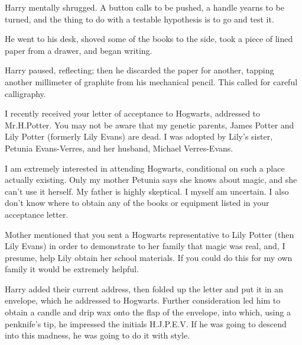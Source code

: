 Harry mentally shrugged. A button calls to be pushed, a handle yearns to be turned, and the thing to do with a testable hypothesis is to go and test it.

He went to his desk, shoved some of the books to the side, took a piece of lined paper from a drawer, and began writing.

\begin{writtenNote}
\end{writtenNote}

Harry paused, reflecting; then he discarded the paper for another, tapping another millimeter of graphite from his mechanical pencil. This called for careful calligraphy.

\begin{writtenNote}


I recently received your letter of acceptance to Hogwarts, addressed to Mr.\?H.\?Potter. You may not be aware that my genetic parents, James Potter and Lily Potter (formerly Lily Evans) are dead. I was adopted by Lily's sister, Petunia Evans-Verres, and her husband, Michael Verres-Evans.

I am extremely interested in attending Hogwarts, conditional on such a place actually existing. Only my mother Petunia says she knows about magic, and she can't use it herself. My father is highly skeptical. I myself am uncertain. I also don't know where to obtain any of the books or equipment listed in your acceptance letter.

Mother mentioned that you sent a Hogwarts representative to Lily Potter (then Lily Evans) in order to demonstrate to her family that magic was real, and, I presume, help Lily obtain her school materials. If you could do this for my own family it would be extremely helpful.

\end{writtenNote}

Harry added their current address, then folded up the letter and put it in an envelope, which he addressed to Hogwarts. Further consideration led him to obtain a candle and drip wax onto the flap of the envelope, into which, using a penknife's tip, he impressed the initials H.J.P.E.V\@. If he was going to descend into this madness, he was going to do it with style.

